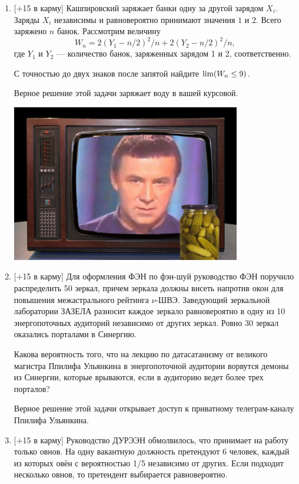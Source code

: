 \documentclass[12pt]{article}
\let\P\relax
\DeclareMathOperator{\P}{\mathbb{P}}
\begin{document}
\begin{enumerate}[resume]
    \item  $[+$15 в карму] Кашпировский заряжает банки одну за другой зарядом $X_i$. Заряды $X_i$ независимы и равновероятно принимают значения $1$ и $2$.
    Всего заряжено $n$ банок. Рассмотрим величину
    \[
    W_n = 2(Y_1 - n/2)^2/n + 2(Y_2 - n/2)^2/n,
    \]
    где $Y_1$ и $Y_2$ — количество банок, заряженных зарядом 1 и 2, соответственно.

    С точностью до двух знаков после запятой найдите $\lim \P(W_n \leq 9)$.

    
    
    Верное решение этой задачи заряжает воду в вашей курсовой.
    

    \begin{center}
    \includegraphics[width=10cm]{kash.jpg}
\end{center}
    
    \item  $[+$15 в карму] Для оформления ФЭН по фэн-шуй руководство ФЭН поручило  распределить 50 зеркал, причем зеркала должны висеть напротив окон для повышения межастрального рейтинга $\nu$-ШВЭ. 
    Заведующий зеркальной лаборатории ЗАЗЕЛА разносит каждое зеркало равновероятно в одну из 10 энергопоточных аудиторий независимо от других зеркал. Ровно 30 зеркал оказались порталами в Синергию. 
    
    Какова вероятность того, что на лекцию по датасатанизму от великого магистра 
    Ппилифа Ульянкина в энергопоточной аудитории ворвутся демоны из Синергии, которые врываются, если в аудиторию ведет более трех порталов?
    
    Верное решение этой задачи открывает доступ к приватному телеграм-каналу Ппилифа Ульянкина. 
    
    \item  $[+$15 в карму] Руководство ДУРЭЭН обмолвилось, что принимает на работу только овнов. На одну вакантную должность претендуют 6 человек, каждый из которых овён с вероятностью 1/5 независимо от других. Если подходит несколько овнов, то претендент выбирается равновероятно.


\end{enumerate}
\end{document}
